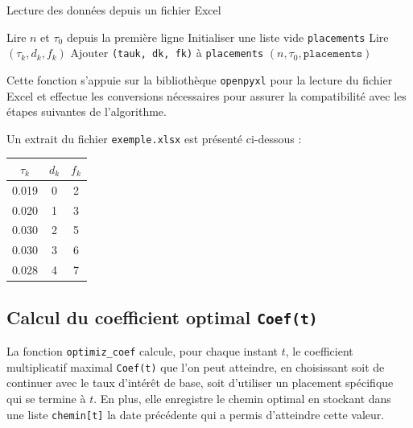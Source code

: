 \documentclass[a4paper,11pt]{article}
\begin{document}
\begin{algorithm}[H]
\caption{Lecture des données depuis un fichier Excel}
\begin{algorithmic}[1]
    \State Lire $n$ et $\tau_0$ depuis la première ligne
    \State Initialiser une liste vide \texttt{placements}
        \State Lire $(\tau_k, d_k, f_k)$
        \State Ajouter \texttt{(tauk, dk, fk)} à \texttt{placements}
    \EndFor
    \State \Return $(n, \tau_0, \texttt{placements})$
\EndFunction
\end{algorithmic}
\end{algorithm}

Cette fonction s’appuie sur la bibliothèque \texttt{openpyxl} pour la lecture du fichier Excel et effectue les conversions nécessaires pour assurer la compatibilité avec les étapes suivantes de l’algorithme.

\vspace{0.5cm}
Un extrait du fichier \texttt{exemple.xlsx} est présenté ci-dessous :

\begin{center}
\begin{tabular}{|c|c|c|}
\hline
$\tau_k$ & $d_k$ & $f_k$ \\
\hline
0.019 & 0 & 2 \\
0.020 & 1 & 3 \\
0.030 & 2 & 5 \\
0.030 & 3 & 6 \\
0.028 & 4 & 7 \\
\hline
\end{tabular}
\label{tab:produits-exemple}
\end{center}


    \subsection{Calcul du coefficient optimal \texttt{Coef(t)}}

    La fonction \texttt{optimiz\_coef} calcule, pour chaque instant $t$, le coefficient multiplicatif maximal \texttt{Coef(t)} que l’on peut atteindre, en choisissant soit de continuer avec le taux d’intérêt de base, soit d’utiliser un placement spécifique qui se termine à $t$.  
    En plus, elle enregistre le chemin optimal en stockant dans une liste \texttt{chemin[t]} la date précédente qui a permis d’atteindre cette valeur.
\end{document}
